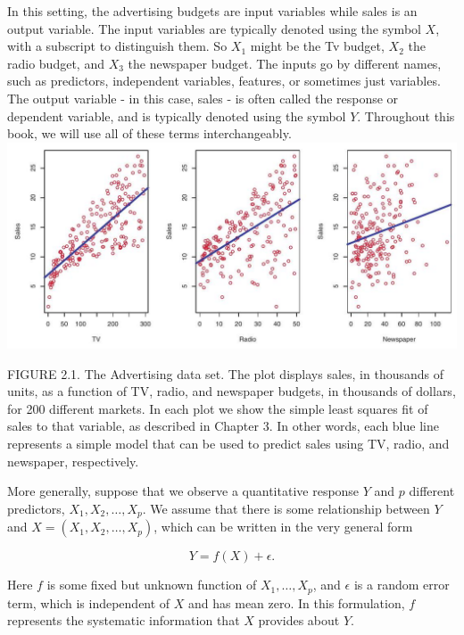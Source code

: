 \documentclass[10pt]{article}
\begin{document}
In this setting, the advertising budgets are input variables while sales is an output variable. The input variables are typically denoted using the symbol $X$, with a subscript to distinguish them. So $X_{1}$ might be the Tv budget, $X_{2}$ the radio budget, and $X_{3}$ the newspaper budget. The inputs go by different names, such as predictors, independent variables, features, or sometimes just variables. The output variable - in this case, sales - is often called the response or dependent variable, and is typically denoted using the symbol $Y$. Throughout this book, we will use all of these terms interchangeably.\\
\includegraphics[max width=\textwidth, center]{2025_05_05_efe77898333945044de4g-031}

FIGURE 2.1. The Advertising data set. The plot displays sales, in thousands of units, as a function of TV, radio, and newspaper budgets, in thousands of dollars, for 200 different markets. In each plot we show the simple least squares fit of sales to that variable, as described in Chapter 3. In other words, each blue line represents a simple model that can be used to predict sales using TV, radio, and newspaper, respectively.

More generally, suppose that we observe a quantitative response $Y$ and $p$ different predictors, $X_{1}, X_{2}, \ldots, X_{p}$. We assume that there is some relationship between $Y$ and $X=\left(X_{1}, X_{2}, \ldots, X_{p}\right)$, which can be written in the very general form


\begin{equation*}
Y=f(X)+\epsilon . \tag{2.1}
\end{equation*}


Here $f$ is some fixed but unknown function of $X_{1}, \ldots, X_{p}$, and $\epsilon$ is a random error term, which is independent of $X$ and has mean zero. In this formulation, $f$ represents the systematic information that $X$ provides about $Y$.
\end{document}
